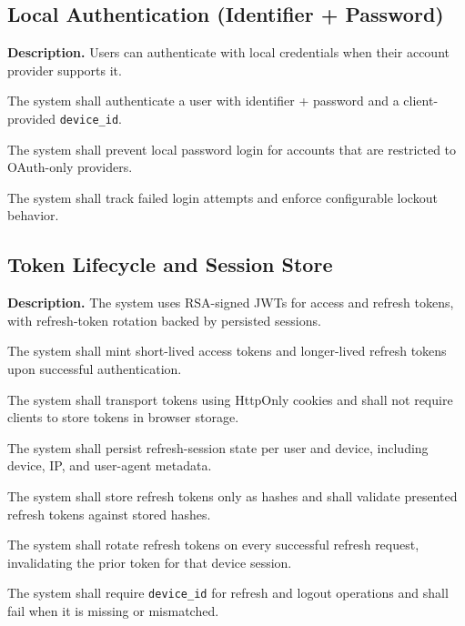 \documentclass[11pt]{article}
\begin{document}
    \subsection{Local Authentication (Identifier + Password)}
    \textbf{Description.} Users can authenticate with local credentials when their account provider supports it.

    \begin{description}[leftmargin=0pt,labelwidth=3.2cm]
  \item[FR-9] The system shall authenticate a user with identifier + password and a client-provided \texttt{device\_id}.
  \item[FR-10] The system shall prevent local password login for accounts that are restricted to OAuth-only providers.
  \item[FR-11] The system shall track failed login attempts and enforce configurable lockout behavior.
    \end{description}

    \subsection{Token Lifecycle and Session Store}
    \textbf{Description.} The system uses RSA-signed JWTs for access and refresh tokens, with refresh-token rotation backed by persisted sessions.

    \begin{description}[leftmargin=0pt,labelwidth=3.2cm]
  \item[FR-12] The system shall mint short-lived access tokens and longer-lived refresh tokens upon successful authentication.
  \item[FR-13] The system shall transport tokens using HttpOnly cookies and shall not require clients to store tokens in browser storage.
  \item[FR-14] The system shall persist refresh-session state per user and device, including device, IP, and user-agent metadata.
  \item[FR-15] The system shall store refresh tokens only as hashes and shall validate presented refresh tokens against stored hashes.
  \item[FR-16] The system shall rotate refresh tokens on every successful refresh request, invalidating the prior token for that device session.
  \item[FR-17] The system shall require \texttt{device\_id} for refresh and logout operations and shall fail when it is missing or mismatched.
    \end{description}
\end{document}
